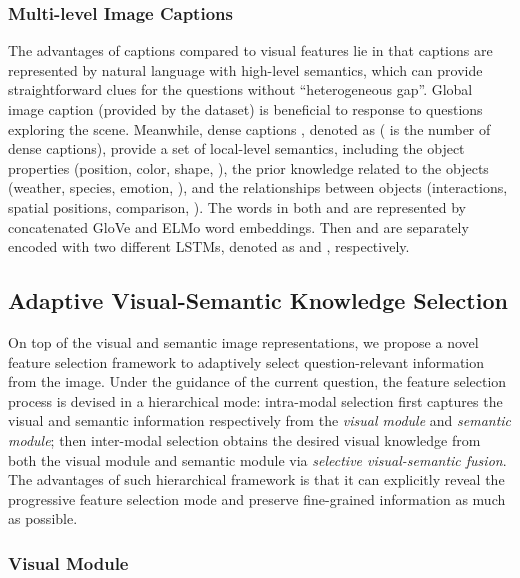 \documentclass[letterpaper]{article} \usepackage{aaai20}  \usepackage{times}  \usepackage{helvet} \usepackage{courier}  \usepackage[hyphens]{url}  \usepackage{graphicx} \urlstyle{rm} \def\UrlFont{\rm}  \usepackage{graphicx}  \frenchspacing  \setlength{\pdfpagewidth}{8.5in}  \setlength{\pdfpageheight}{11in}  \usepackage{mathrsfs} \usepackage{amsfonts,amssymb}  \usepackage{tabularx} \usepackage{url}
\begin{document}
\subsubsection{Multi-level Image Captions} The advantages of captions compared to visual features lie in that captions are represented by natural language with high-level semantics, which can provide straightforward clues for the questions without ``heterogeneous gap''. Global image caption  (provided by the dataset) is beneficial to response to questions exploring the scene. Meanwhile, dense captions \cite{johnson2016densecap}, denoted as  ( is the number of dense captions), provide a set of local-level semantics, including the object properties (position, color, shape, ), the prior knowledge related to the objects (weather, species, emotion, ), and the relationships between objects (interactions, spatial positions, comparison, ). The words in both  and  are represented by concatenated GloVe \cite{Pennington2014Glove} and ELMo \cite{Peters2018Deep} word embeddings. Then  and  are separately encoded with two different LSTMs, denoted as  and , respectively.

\subsection{Adaptive Visual-Semantic Knowledge Selection}
\label{selection}

On top of the visual and semantic image representations, we propose a novel feature selection framework to adaptively select question-relevant information from the image. Under the guidance of the current question, the feature selection process is devised in a hierarchical mode: intra-modal selection first captures the visual and semantic information respectively from the \textit{visual module} and \textit{semantic module}; then inter-modal selection obtains the desired visual knowledge from both the visual module and semantic module via \textit{selective visual-semantic fusion}. The advantages of such hierarchical framework is that it can explicitly reveal the progressive feature selection mode and preserve fine-grained information as much as possible.





\subsubsection{Visual Module}
\end{document}
